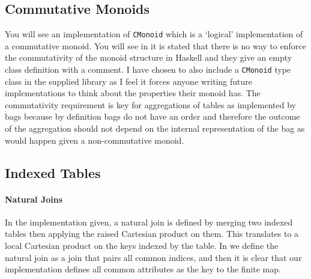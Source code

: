 \subsection{Commutative Monoids}
You will see an implementation of \texttt{CMonoid} which is a `logical'
implementation of a commutative monoid. You will see in
\cite{RelationalAlgebraByWayOfAdjunctions} it is stated that there is no way to
enforce the commutativity of the monoid structure in Haskell and they give an
empty class definition with a comment. I have chosen to also include a
\texttt{CMonoid} type class in the supplied library as I feel it forces anyone
writing future implementations to think about the properties their monoid has.
The commutativity requirement is key for aggregations of tables as implemented
by bags because by definition bags do not have an order and therefore the
outcome of the aggregation should not depend on the internal representation of
the bag as would happen given a non-commutative monoid. 

\subsection{Indexed Tables}
\paragraph{Natural Joins} In the implementation given, a natural join is defined
by  merging two indexed tables
then applying the raised Cartesian product on them. This translates to a local
Cartesian product on the keys indexed by the table. In  we
define the natural join as a join that pairs all common indices, and then it is
clear that our implementation defines all common attributes as the key to the
finite map.

